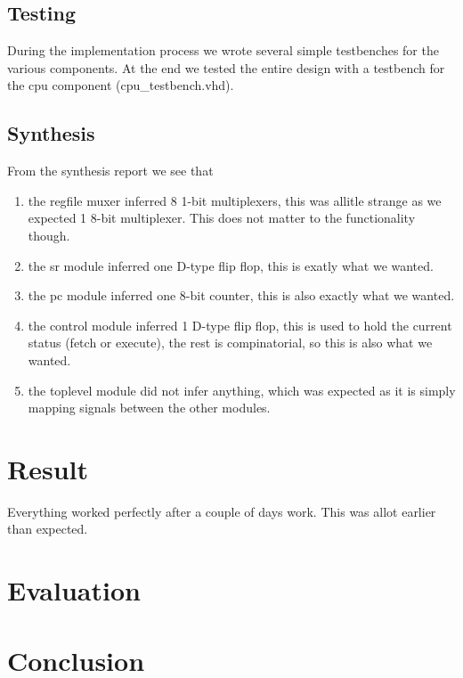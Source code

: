 \documentclass[10pt]{article}
\begin{document}
	\subsection*{Testing}

	During the implementation process we wrote several simple testbenches for the various components. At the end we tested the entire design with a testbench for the cpu component (cpu\_testbench.vhd).

	\subsection*{Synthesis}

	From the synthesis report we see that 
	\begin{enumerate}
		\item the regfile muxer inferred 8 1-bit multiplexers, this was allitle strange as we expected 1 8-bit multiplexer. This does not matter to the functionality though.
		\item the sr module inferred one D-type flip flop, this is exatly what we wanted.
		\item the pc module inferred one 8-bit counter, this is also exactly what we wanted.
		\item the control module inferred 1 D-type flip flop, this is used to hold the current status (fetch or execute), the rest is compinatorial, so this is also what we wanted.
		\item the toplevel module did not infer anything, which was expected as it is simply mapping signals between the other modules.
	\end{enumerate}

	\section*{Result}


	Everything worked perfectly after a couple of days work. This was allot earlier than expected.



	\section*{Evaluation}


	\section*{Conclusion}

\end{document}
